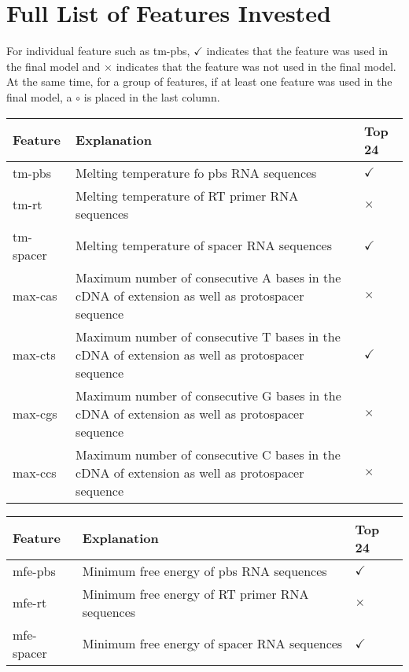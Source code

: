 \chapter{Full List of Features Invested}
\label{appendix:features}

For individual feature such as tm-pbs, $\checkmark$ indicates that the feature was used in the final model and $\times$ indicates that the feature was not used in the final model. At the same time, for a group of features, if at least one feature was used in the final model, a $\circ$ is placed in the last column. 

\begin{table}[ht]
    \centering
    \begin{tabular}{|p{}|p{}|p{}|}
        \hline
        \textbf{Feature} & \textbf{Explanation} & \textbf{Top 24} \\ 
        \hline
        tm-pbs& Melting temperature fo pbs RNA sequences & $\checkmark$ \\
        \hline
        tm-rt& Melting temperature of RT primer RNA sequences & $\times$ \\
        \hline
        tm-spacer& Melting temperature of spacer RNA sequences & $\checkmark$ \\
        \hline
        max-cas & Maximum number of consecutive A bases in the cDNA of extension as well as protospacer sequence & $\times$ \\
        \hline
        max-cts & Maximum number of consecutive T bases in the cDNA of extension as well as protospacer sequence & $\checkmark$ \\
        \hline
        max-cgs & Maximum number of consecutive G bases in the cDNA of extension as well as protospacer sequence & $\times$ \\
        \hline
        max-ccs & Maximum number of consecutive C bases in the cDNA of extension as well as protospacer sequence & $\times$ \\
        \hline
    \end{tabular}
\end{table}

\begin{table}[ht]
    \centering
    \begin{tabular}{|p{}|p{}|p{}|}
        \hline
        \textbf{Feature} & \textbf{Explanation} & \textbf{Top 24} \\ 
        \hline
        mfe-pbs & Minimum free energy of pbs RNA sequences & $\checkmark$ \\
        \hline
        mfe-rt & Minimum free energy of RT primer RNA sequences & $\times$ \\
        \hline
        mfe-spacer & Minimum free energy of spacer RNA sequences & $\checkmark$ \\
        \hline
    \end{tabular}
\end{table}

